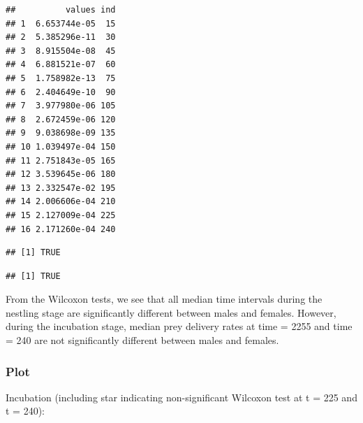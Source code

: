 \documentclass[]{article}
\newenvironment{Shaded}{\begin{snugshade}}{\end{snugshade}}
\newcommand{\CommentTok}[1]{\textcolor[rgb]{0.56,0.35,0.01}{\textit{#1}}}
\newcommand{\FloatTok}[1]{\textcolor[rgb]{0.00,0.00,0.81}{#1}}
\newcommand{\KeywordTok}[1]{\textcolor[rgb]{0.13,0.29,0.53}{\textbf{#1}}}
\newcommand{\NormalTok}[1]{#1}
\newcommand{\OperatorTok}[1]{\textcolor[rgb]{0.81,0.36,0.00}{\textbf{#1}}}
\newcommand{\StringTok}[1]{\textcolor[rgb]{0.31,0.60,0.02}{#1}}
\begin{document}
\begin{verbatim}
##          values ind
## 1  6.653744e-05  15
## 2  5.385296e-11  30
## 3  8.915504e-08  45
## 4  6.881521e-07  60
## 5  1.758982e-13  75
## 6  2.404649e-10  90
## 7  3.977980e-06 105
## 8  2.672459e-06 120
## 9  9.038698e-09 135
## 10 1.039497e-04 150
## 11 2.751843e-05 165
## 12 3.539645e-06 180
## 13 2.332547e-02 195
## 14 2.006606e-04 210
## 15 2.127009e-04 225
## 16 2.171260e-04 240
\end{verbatim}

\begin{Shaded}
\end{Shaded}

\begin{verbatim}
## [1] TRUE
\end{verbatim}

\begin{Shaded}
\end{Shaded}

\begin{verbatim}
## [1] TRUE
\end{verbatim}

From the Wilcoxon tests, we see that all median time intervals during
the nestling stage are significantly different between males and
females. However, during the incubation stage, median prey delivery
rates at time = 2255 and time = 240 are not significantly different
between males and females.

\hypertarget{plot}{%
\subsubsection{Plot}\label{plot}}

Incubation (including star indicating non-significant Wilcoxon test at t
= 225 and t = 240):
\end{document}
